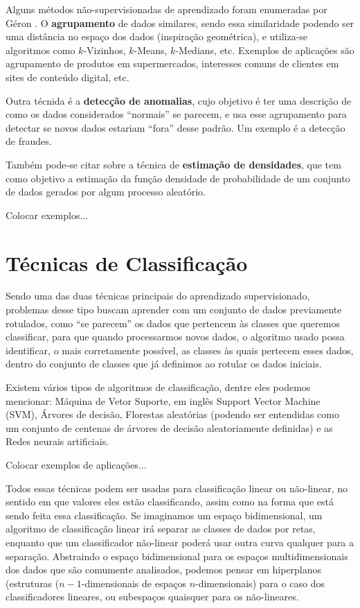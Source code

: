 Alguns métodos não-supervisionadas de aprendizado foram enumeradas por Géron \citep{hands}. O \textbf{agrupamento} de dados similares, sendo essa similaridade podendo ser uma distância no espaço dos dados (inspiração geométrica), e utiliza-se algoritmos como $k$-Vizinhos, $k$-Means, $k$-Medians, etc. Exemplos de aplicações são agrupamento de produtos em supermercados, interesses comuns de clientes em sites de conteúdo digital, etc.

Outra técnida é a \textbf{detecção de anomalias}, cujo objetivo é ter uma descrição de como os dados considerados ``normais'' se parecem, e usa esse agrupamento para detectar se novos dados estariam ``fora'' desse padrão. Um exemplo é a detecção de fraudes.

Também pode-se citar sobre a técnica de \textbf{estimação de densidades}, que tem como objetivo a estimação da função densidade de probabilidade de um conjunto de dados gerados por algum processo aleatório.

Colocar exemplos...

\section{Técnicas de Classificação}

Sendo uma das duas técnicas principais do aprendizado supervisionado, problemas desse tipo buscam aprender com um conjunto de dados previamente rotulados, como ``se parecem'' os dados que pertencem às classes que queremos classificar, para que quando processarmos novos dados, o algoritmo usado possa identificar, o mais corretamente possível, as classes às quais pertecem esses dados, dentro do conjunto de classes que já definimos ao rotular os dados iniciais.

Existem vários tipos de algoritmos de classificação, dentre eles podemos mencionar: Máquina de Vetor Suporte, em inglês Support Vector Machine (SVM), Árvores de decisão, Florestas aleatórias (podendo ser entendidas como um conjunto de centenas de árvores de decisão aleatoriamente definidas) e as Redes neurais artificiais.

Colocar exemplos de aplicações...

Todos essas técnicas podem ser usadas para classificação linear ou não-linear, no sentido em que valores eles estão classificando, assim como na forma que está sendo feita essa classificação. Se imaginamos um espaço bidimensional, um algoritmo de classificação linear irá separar as classes de dados por retas, enquanto que um classificador não-linear poderá usar outra curva qualquer para a separação. Abstraindo o espaço bidimensional para os espaços multidimensionais dos dados que são comumente analisados, podemos pensar em hiperplanos (estruturas ($n{-}1$-dimensionais de espaços $n$-dimensionais) para o caso dos classificadores lineares, ou subespaços quaisquer para os não-lineares.

